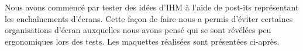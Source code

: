 Nous avons commencé par tester des idées d'IHM à l'aide de post-its
représentant les enchaînements d'écrans. Cette façon de faire nous a
permis d'éviter certaines organisations d'écran auxquelles nous avons
pensé qui se sont révélées peu ergonomiques lors des tests. Les
maquettes réalisées sont présentées ci-après.

